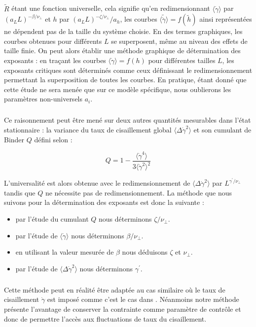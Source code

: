 \subparagraph{}$\tilde{R}$ étant une fonction universelle, cela signifie qu'en redimensionnant $\langle\dot{\gamma}\rangle $ par $(a_LL)^{-\beta/\nu_\perp}$ et $h$ par $(a_LL)^{-\zeta/\nu_\perp}/a_h$, les courbes $\langle\tilde{\dot{\gamma}}\rangle = f(\tilde{h})$ ainsi représentées ne dépendent pas de la taille du système choisie. En des termes graphiques, les courbes obtenues pour différents $L$ se superposent, même au niveau des effets de taille finie. On peut alors établir une méthode graphique de détermination des exposants : en traçant les courbes $\langle \dot{\gamma} \rangle = f(h)$ pour différentes tailles $L$, les exposants critiques sont déterminés comme ceux définissant le redimensionnement permettant la superposition de toutes les courbes. En pratique, étant donné que cette étude ne sera menée que sur ce modèle spécifique, nous oublierons les paramètres non-universels $a_i$.

\subparagraph{}Ce raisonnement peut être mené sur deux autres quantités mesurables dans l'état stationnaire : la variance du taux de cisaillement global $\langle\Delta\dot{\gamma}^2\rangle$ et son cumulant de Binder $Q$ \cite{binder_finite_1981} défini selon :

\begin{equation}
    Q = 1 - \frac{\langle\dot{\gamma}^4\rangle}{3\langle\dot{\gamma}^2\rangle^2}
\end{equation}

\noindent L'universalité est alors obtenue avec le redimensionnement de $\langle\Delta\dot{\gamma}^2\rangle$ par $L^{\gamma^\prime/\nu_\perp}$ tandis que $Q$ ne nécessite pas de redimensionnement. La méthode que nous suivons pour la détermination des exposants est donc la suivante : 

\begin{itemize}
	\item par l'étude du cumulant $Q$ nous déterminons $\zeta/\nu_\perp$.
	\item par l'étude de $\langle\dot{\gamma}\rangle$ nous déterminons $\beta/\nu_\perp$.
	\item en utilisant la valeur mesurée de $\beta$ nous déduisons $\zeta$ et $\nu_\perp$.
	\item par l'étude de $\langle\Delta\dot{\gamma}^2\rangle$ nous déterminons $\gamma^\prime$.
\end{itemize}

\subparagraph{}Cette méthode peut en réalité être adaptée au cas similaire où le taux de cisaillement $\dot{\gamma}$ est imposé comme c'est le cas dans \cite{lin_scaling_2014}. Néanmoins notre méthode présente l'avantage de conserver la contrainte comme paramètre de contrôle et donc de permettre l'accès aux fluctuations de taux du cisaillement.

